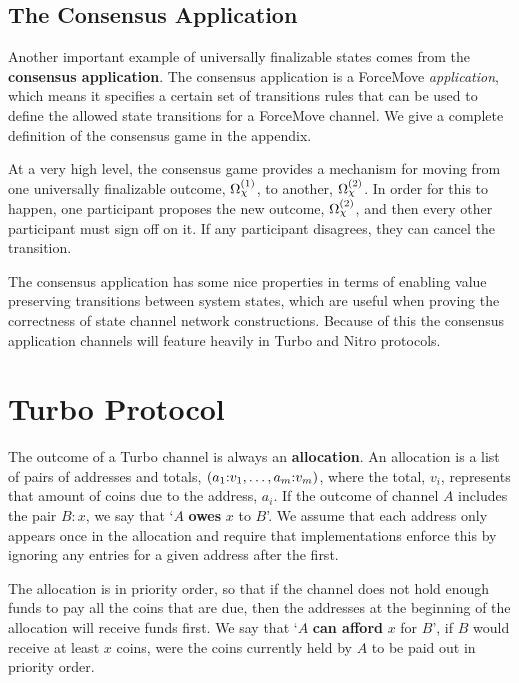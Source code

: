 \documentclass{article}
\begin{document}
\subsection{The Consensus Application}

Another important example of universally finalizable states comes from the \textbf{consensus application}.
The consensus application is a ForceMove \textit{application}, which means it specifies a certain
set of transitions rules that can be used to define the allowed state transitions for a ForceMove
channel.
We give a complete definition of the consensus game in the appendix.

At a very high level, the consensus game provides a mechanism for moving from one universally
finalizable outcome, $\Omega_\rchi^{(1)}$, to another, $\Omega_\rchi^{(2)}$. 
In order for this to happen, one participant proposes the new outcome, $\Omega_\rchi^{(2)}$, and then
every other participant must sign off on it. 
If any participant disagrees, they can cancel the transition.

The consensus application has some nice properties in terms of enabling value preserving transitions between system states, which are useful when proving the correctness of state channel network constructions.
Because of this the consensus application channels will feature heavily in Turbo and Nitro protocols.

\section{Turbo Protocol}

The outcome of a Turbo channel is always an \textbf{allocation}.
An allocation is a list of pairs of addresses and totals, $( a_1{:}v_1, \dots, a_m{:}v_m )$, where the total, $v_i$, represents that amount of coins due to the address, $a_i$.
If the outcome of channel $A$ includes the pair $B{:}x$, we say that `$A$ \textbf{owes} $x$ to $B$'.
We assume that each address only appears once in the allocation and require that implementations enforce this by ignoring any entries for a given address after the first.

The allocation is in priority order, so that if the channel does not hold enough funds to pay all the coins that are due, then the addresses at the beginning of the allocation will receive funds first.
We say that `$A$ \textbf{can afford} $x$ for $B$', if $B$ would receive at least $x$ coins, were the coins currently held by $A$ to be paid out in priority order.
\end{document}
